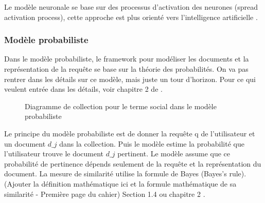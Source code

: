 Le modèle neuronale se base sur des processus d'activation des neurones (spread activation process), cette approche est plus orienté vers l’intelligence artificielle \citep*{modern-ir}.

\subsubsection{Modèle probabiliste}
Dans le modèle probabiliste, le framework pour modéliser les documents et la représentation de la requête se base sur la théorie des probabilités. On va pas rentrer dans les détails sur ce modèle, mais juste un tour d'horizon. Pour ce qui veulent entrée dans les détails, voir chapitre 2 de \citep{modern-ir}.

\begin{figure}[htbp]
    \begin{center}
        \caption{Diagramme de collection pour le terme social dans le modèle probabiliste \citep{model-ir}}
    \end{center}
    \label{probabilistic-model}
\end{figure}

Le principe du modèle probabiliste est de donner la requête q de l'utilisateur et un document $d\_{j}$ dans la collection. Puis le modèle estime la probabilité que l'utilisateur trouve le document $d\_{j}$ pertinent. Le modèle assume que ce probabilité de pertinence dépends seulement de la requête et la représentation du document. La mesure de similarité utilise la formule de Bayes (Bayes's rule).
(Ajouter la définition mathématique ici et la formule mathématique de sa similarité - Première page du cahier) Section 1.4 \citep{model-ir} ou chapitre 2 \citep{modern-ir}.

